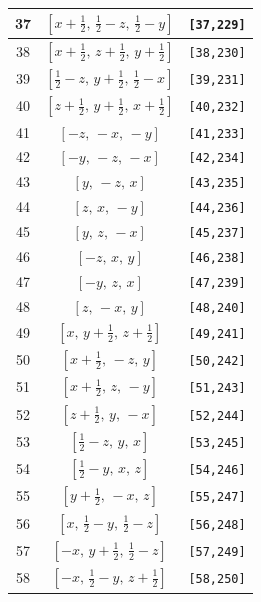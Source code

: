 \documentclass[fleqn,8pt]{jsarticle}
\begin{document}
\begin{longtable}{ccc}
37 & $\left[ x + \frac{1}{2},\, \frac{1}{2} - z,\, \frac{1}{2} - y \right]$ & {\tt [37,229]} \\ \hline
38 & $\left[ x + \frac{1}{2},\, z + \frac{1}{2},\, y + \frac{1}{2} \right]$ & {\tt [38,230]} \\ \hline
39 & $\left[ \frac{1}{2} - z,\, y + \frac{1}{2},\, \frac{1}{2} - x \right]$ & {\tt [39,231]} \\ \hline
40 & $\left[ z + \frac{1}{2},\, y + \frac{1}{2},\, x + \frac{1}{2} \right]$ & {\tt [40,232]} \\ \hline
41 & $\left[ - z,\, - x,\, - y \right]$ & {\tt [41,233]} \\ \hline
42 & $\left[ - y,\, - z,\, - x \right]$ & {\tt [42,234]} \\ \hline
43 & $\left[ y,\, - z,\, x \right]$ & {\tt [43,235]} \\ \hline
44 & $\left[ z,\, x,\, - y \right]$ & {\tt [44,236]} \\ \hline
45 & $\left[ y,\, z,\, - x \right]$ & {\tt [45,237]} \\ \hline
46 & $\left[ - z,\, x,\, y \right]$ & {\tt [46,238]} \\ \hline
47 & $\left[ - y,\, z,\, x \right]$ & {\tt [47,239]} \\ \hline
48 & $\left[ z,\, - x,\, y \right]$ & {\tt [48,240]} \\ \hline
49 & $\left[ x,\, y + \frac{1}{2},\, z + \frac{1}{2} \right]$ & {\tt [49,241]} \\ \hline
50 & $\left[ x + \frac{1}{2},\, - z,\, y \right]$ & {\tt [50,242]} \\ \hline
51 & $\left[ x + \frac{1}{2},\, z,\, - y \right]$ & {\tt [51,243]} \\ \hline
52 & $\left[ z + \frac{1}{2},\, y,\, - x \right]$ & {\tt [52,244]} \\ \hline
53 & $\left[ \frac{1}{2} - z,\, y,\, x \right]$ & {\tt [53,245]} \\ \hline
54 & $\left[ \frac{1}{2} - y,\, x,\, z \right]$ & {\tt [54,246]} \\ \hline
55 & $\left[ y + \frac{1}{2},\, - x,\, z \right]$ & {\tt [55,247]} \\ \hline
56 & $\left[ x,\, \frac{1}{2} - y,\, \frac{1}{2} - z \right]$ & {\tt [56,248]} \\ \hline
57 & $\left[ - x,\, y + \frac{1}{2},\, \frac{1}{2} - z \right]$ & {\tt [57,249]} \\ \hline
58 & $\left[ - x,\, \frac{1}{2} - y,\, z + \frac{1}{2} \right]$ & {\tt [58,250]} \\ \hline

\end{longtable}
\end{document}
